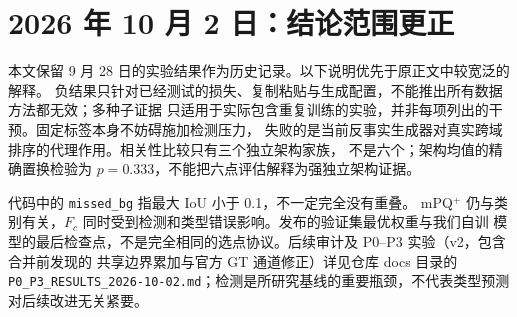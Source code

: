 \section*{2026 年 10 月 2 日：结论范围更正}
本文保留 9 月 28 日的实验结果作为历史记录。以下说明优先于原正文中较宽泛的解释。
负结果只针对已经测试的损失、复制粘贴与生成配置，不能推出所有数据方法都无效；多种子证据
只适用于实际包含重复训练的实验，并非每项列出的干预。固定标签本身不妨碍施加检测压力，
失败的是当前反事实生成器对真实跨域排序的代理作用。相关性比较只有三个独立架构家族，
不是六个；架构均值的精确置换检验为 $p=0.333$，不能把六点评估解释为强独立架构证据。

代码中的 \texttt{missed\_bg} 指最大 IoU 小于 0.1，不一定完全没有重叠。
mPQ$^+$ 仍与类别有关，$F_c$ 同时受到检测和类型错误影响。发布的验证集最优权重与我们自训
模型的最后检查点，不是完全相同的选点协议。后续审计及 P0--P3 实验（v2，包含合并前发现的
共享边界累加与官方 GT 通道修正）详见仓库 docs 目录的
\texttt{P0\_P3\_RESULTS\_2026-10-02.md}；检测是所研究基线的重要瓶颈，不代表类型预测
对后续改进无关紧要。
\clearpage
